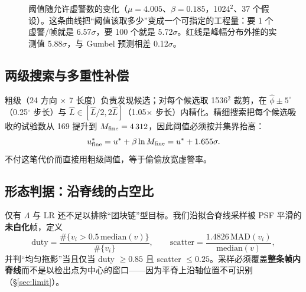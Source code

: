 \documentclass[11pt,a4paper]{ctexart}
\newcommand{\Lam}{\ensuremath{\Lambda}}
\begin{document}
\begin{figure}[htbp]\centering
{}
\caption{阈值随允许虚警数的变化（$\mu=4.005$、$\beta=0.185$，1024$^2$、37 个假设）。这条曲线把“阈值该取多少”变成一个可指定的工程量：要 1 个虚警/帧就是 6.57$\sigma$，要 100 个就是 5.72$\sigma$。红线是峰幅分布外推的实测值 5.88$\sigma$，与 Gumbel 预测相差 0.12$\sigma$。}
\label{fig:thr}
\end{figure}

\subsection{两级搜索与多重性补偿}
粗级（24 方向 × 7 长度）负责发现候选；对每个候选取 1536$^2$ 裁剪，在 $\hat\phi\pm5^\circ$（0.25$^\circ$ 步长）与 $\hat L\in[\hat L/2,2\hat L]$（1.05$\times$ 步长）内精化。精细搜索把每个候选吸收的试验数从 169 提升到 $M_{\rm fine}=4\,312$，因此阈值必须按并集界抬高：
\begin{equation}
u^*_{\rm fine}=u^*+\beta\ln M_{\rm fine}=u^*+1.655\sigma .
\end{equation}
不付这笔代价而直接用粗级阈值，等于偷偷放宽虚警率。

\subsection{形态判据：沿脊线的占空比}
仅有 $\Lam$ 与 $\mathrm{LR}$ 还不足以排除“团块链”型目标。我们沿拟合脊线采样被 PSF 平滑的\textbf{未白化}帧，定义
\begin{equation}
\text{duty}=\frac{\#\{v_i>0.5\,\mathrm{median}(v)\}}{\#\{v_i\}},\qquad
\text{scatter}=\frac{1.4826\,\mathrm{MAD}(v_i)}{\mathrm{median}(v)},
\end{equation}
并判“均匀拖影”当且仅当 duty $\ge0.85$ 且 scatter $\le0.25$。采样必须覆盖\textbf{整条帧内脊线}而不是以检出点为中心的窗口——因为平脊上沿轴位置不可识别（§\ref{sec:limit}）。
\end{document}
